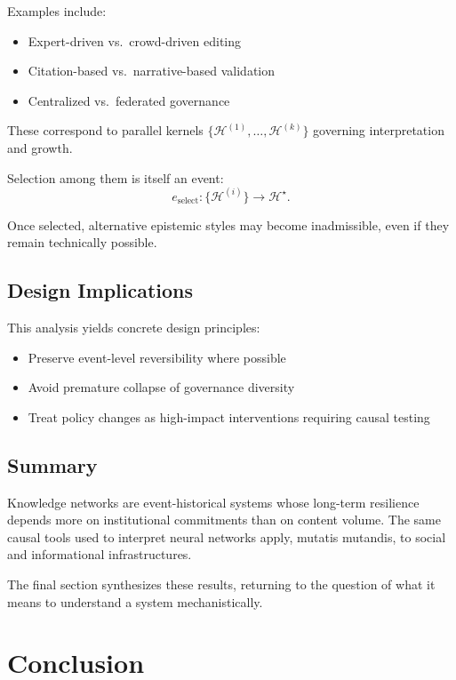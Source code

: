 \documentclass[11pt]{article}
\theoremstyle{remark}
\newcommand{\Hist}{\mathcal{H}}
\begin{document}
Examples include:
\begin{itemize}
\item Expert-driven vs.\ crowd-driven editing
\item Citation-based vs.\ narrative-based validation
\item Centralized vs.\ federated governance
\end{itemize}

These correspond to parallel kernels $\{\Hist^{(1)}, \ldots,
\Hist^{(k)}\}$ governing interpretation and growth.

Selection among them is itself an event:
\[
e_{\text{select}}: \{\Hist^{(i)}\} \to \Hist^\star.
\]

Once selected, alternative epistemic styles may become inadmissible,
even if they remain technically possible.

\subsection{Design Implications}

This analysis yields concrete design principles:

\begin{itemize}
\item Preserve event-level reversibility where possible
\item Avoid premature collapse of governance diversity
\item Treat policy changes as high-impact interventions requiring
causal testing
\end{itemize}

\subsection{Summary}

Knowledge networks are event-historical systems whose long-term
resilience depends more on institutional commitments than on content
volume. The same causal tools used to interpret neural networks apply,
mutatis mutandis, to social and informational infrastructures.

The final section synthesizes these results, returning to the question
of what it means to understand a system mechanistically.


\section{Conclusion}
\end{document}
